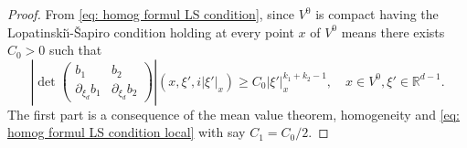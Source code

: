 \documentclass[JEP,XML,SOM,Unicode,published]{cedram}
\theoremstyle{plain}
\theoremstyle{definition}
\def\R{\mathbb{R}}
\newcommand{\LS}{Lopatinski\u{\i}-\v{S}apiro\xspace}
\begin{document}
\begin{proof}

From \eqref{eq: homog formul LS condition}, since $V^0$ is compact
having the \LS condition holding at every point $x$ of $V^0$ means
there exists $C_0>0$ such that
\begin{equation}
\label{eq: homog formul LS condition local}
\left|\det
\begin{pmatrix}
b_1 &b_2\\[
2pt]
\partial_{\xi_d}b_1& \partial_{\xi_d}b_2
\end{pmatrix}\right|(x,\xi',i |\xi'|_x)
\geq C_0 |\xi'|_x^{k_1+k_2 -1},
\quad x \in V^0, \xi' \in \R^{d-1}.
\end{equation}
The first part is a consequence of the mean value theorem,
homogeneity and \eqref{eq: homog formul LS
condition local} with say $C_1 = C_0 /2$.


\end{proof}
\end{document}
